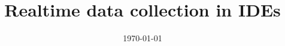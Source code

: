 \documentclass[a4paper, 11pt, oneside]{thesis}  %
\begin{document}
\frontmatter	  %
\title{Realtime data collection in IDEs}
\addresses  {\groupname\\\deptname\\\univname}  %
\date       {\today}
\subject    {}
\keywords   {}

\def\chapterautorefname{Chapter}%
\def\sectionautorefname{Section}%
\def\subsectionautorefname{Subsection}%


\newcommand{\idname}{Moji-Identicon} 
\newcommand{\idnames}{Moji-Identicons} 


\maketitle


\fancyhead{}  %
\rhead{\thepage}  %
\lhead{}  %

\pagestyle{fancy}  %

\end{document}
